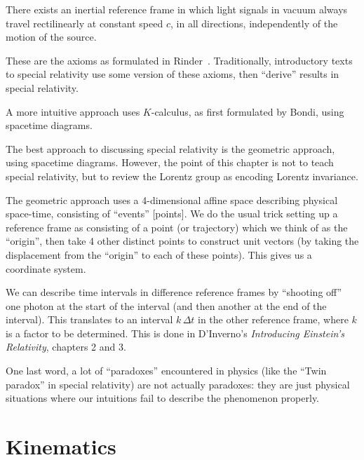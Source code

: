 \begin{axiom}
There exists an inertial reference frame in which light signals in
vacuum always travel rectilinearly at constant speed $c$, in all
directions, independently of the motion of the source.
\end{axiom}

\begin{remark}
These are the axioms as formulated in Rinder~\cite[\S4]{Rindler:1991sr}.
Traditionally, introductory texts to special relativity use some version
of these axioms, then ``derive'' results in special relativity.

A more intuitive approach uses $K$-calculus, as first formulated by
Bondi, using spacetime diagrams.
\end{remark}

\M
The best approach to discussing special relativity is the geometric
approach, using spacetime diagrams. However, the point of this chapter
is not to teach special relativity, but to review the Lorentz group as
encoding Lorentz invariance.

The geometric approach uses a 4-dimensional affine space describing
physical space-time, consisting of ``events'' [points]. We do the usual
trick setting up a reference frame as consisting of a point (or trajectory)
which we think of as the ``origin'', then take 4 other distinct points
to construct unit vectors (by taking the displacement from the
``origin'' to each of these points). This gives us a coordinate system.

We can describe time intervals in difference reference frames by
``shooting off'' one photon at the start of the interval (and then
another at the end of the interval). This translates to an interval
$k\,\Delta t$ in the other reference frame, where $k$ is a factor to be
determined. This is done in D'Inverno's \textit{Introducing Einstein's Relativity},
chapters 2 and 3.

One last word, a lot of ``paradoxes'' encountered in physics (like the
``Twin paradox'' in special relativity) are not actually paradoxes: they
are just physical situations where our intuitions fail to describe the
phenomenon properly.

\section{Kinematics}

